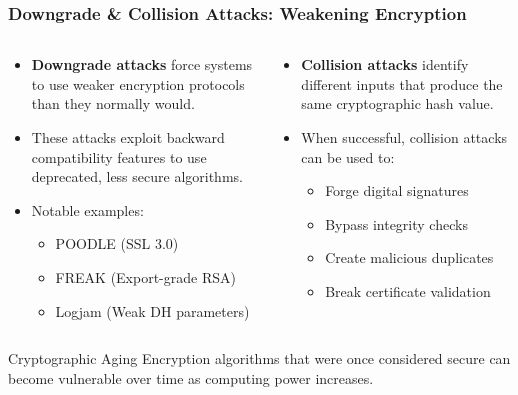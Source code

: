 \documentclass{beamer}
\begin{document}
\begin{frame}
    \frametitle{Downgrade \& Collision Attacks: Weakening Encryption}
    
    \begin{columns}
        \begin{column}{0.5\textwidth}
            \begin{itemize}
                \item \textbf{Downgrade attacks} force systems to use weaker encryption protocols than they normally would.
                \item These attacks exploit backward compatibility features to use deprecated, less secure algorithms.
                \item Notable examples:
                    \begin{itemize}
                        \item POODLE (SSL 3.0)
                        \item FREAK (Export-grade RSA)
                        \item Logjam (Weak DH parameters)
                    \end{itemize}
            \end{itemize}
        \end{column}
        \begin{column}{0.5\textwidth}
            \begin{itemize}
                \item \textbf{Collision attacks} identify different inputs that produce the same cryptographic hash value.
                \item When successful, collision attacks can be used to:
                    \begin{itemize}
                        \item Forge digital signatures
                        \item Bypass integrity checks
                        \item Create malicious duplicates
                        \item Break certificate validation
                    \end{itemize}
            \end{itemize}
        \end{column}
    \end{columns}
    
    \begin{block}{Cryptographic Aging}
        Encryption algorithms that were once considered secure can become vulnerable over time as computing power increases.
    \end{block}
\end{frame}
\end{document}
